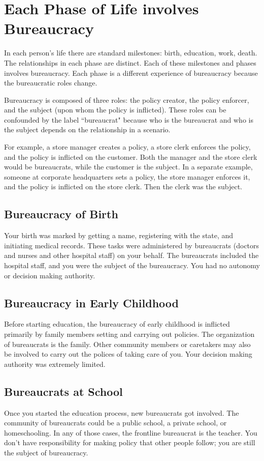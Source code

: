 \section{Each Phase of Life involves Bureaucracy}
In each person's life there are standard milestones: birth, education, work, death. 
The relationships in each phase are distinct.
Each of these milestones and phases involves bureaucracy. Each phase is a different experience of bureaucracy because the bureaucratic roles change.

Bureaucracy is composed of three roles: the policy creator, the policy enforcer, and the subject (upon whom the policy is inflicted). 
These roles can be confounded by the label ``bureaucrat" because who is the bureaucrat and who is the subject depends on the relationship in a scenario. 

For example, a store manager creates a policy, a store clerk enforces the policy, and the policy is inflicted on the customer. Both the manager and the store clerk would be bureaucrats, while the customer is the subject. In a separate example, someone at corporate headquarters sets a policy, the store manager enforces it, and the policy is inflicted on the store clerk. Then the clerk was the subject. 


\subsection*{Bureaucracy of Birth\label{sec:bureacracy-of-birth}}
Your birth was marked by getting a name, registering with the state, and initiating medical records. These tasks were administered by bureaucrats (doctors and nurses and other hospital staff) on your behalf. The bureaucrats included the hospital staff, and you were the subject of the bureaucracy. You had no autonomy or decision making authority. 

\subsection*{Bureaucracy in Early Childhood\label{sec:bureaucracy-early-childhood}}
Before starting education, the bureaucracy of early childhood is inflicted primarily by family members setting and carrying out policies. The organization of bureaucrats is the family. Other community members or caretakers may also be involved to carry out the polices of taking care of you. Your decision making authority was extremely limited. 

\subsection*{Bureaucrats at School\label{sec:bureaucracy-of-school}}
Once you started the education process, new bureaucrats got involved.  The community of bureaucrats could be a public school, a private school, or homeschooling. In any of those cases, the frontline bureaucrat is the teacher. You don't have responsibility for making policy that other people follow; you are still the subject of bureaucracy.


